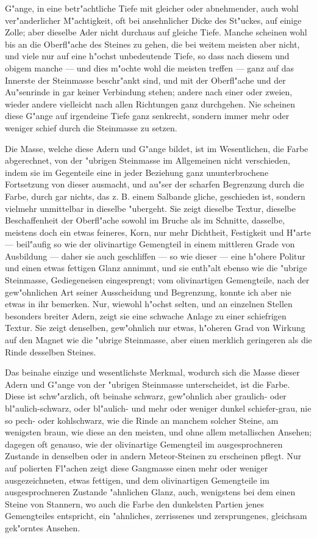 \documentclass[a4paper, 11pt, oneside, german]{article}
\begin{document}
G"ange, in eine betr"achtliche Tiefe mit gleicher oder abnehmender, auch wohl ver"anderlicher M"achtigkeit, oft bei ansehnlicher Dicke des St"uckes, auf einige Zolle; aber dieselbe Ader nicht durchaus auf gleiche Tiefe. Manche scheinen wohl bis an die Oberfl"ache des Steines zu gehen, die bei weitem meisten aber nicht, und viele nur auf eine h"ochst unbedeutende Tiefe, so dass nach diesem und obigem manche --- und dies m"ochte wohl die meisten treffen --- ganz auf das Innerste der Steinmasse beschr"ankt sind, und mit der Oberfl"ache und der Au"senrinde in gar keiner Verbindung stehen; andere nach einer oder zweien, wieder andere vielleicht nach allen Richtungen ganz durchgehen. Nie scheinen diese G"ange auf irgendeine Tiefe ganz senkrecht, sondern immer mehr oder weniger schief durch die Steinmasse zu setzen.

Die Masse, welche diese Adern und G"ange bildet, ist im Wesentlichen, die Farbe abgerechnet, von der "ubrigen Steinmasse im Allgemeinen nicht verschieden, indem sie im Gegenteile eine in jeder Beziehung ganz ununterbrochene Fortsetzung von dieser ausmacht, und au"ser der scharfen Begrenzung durch die Farbe, durch gar nichts, das z. B. einem Salbande gliche, geschieden ist, sondern vielmehr unmittelbar in dieselbe "ubergeht. Sie zeigt dieselbe Textur, dieselbe Beschaffenheit der Oberfl"ache sowohl im Bruche als im Schnitte, dasselbe, meistens doch ein etwas feineres, Korn, nur mehr Dichtheit, Festigkeit und H"arte --- beil"aufig so wie der olivinartige Gemengteil in einem mittleren Grade von Ausbildung --- daher sie auch geschliffen --- so wie dieser --- eine h"ohere Politur und einen etwas fettigen Glanz annimmt, und sie enth"alt ebenso wie die "ubrige Steinmasse, Gediegeneisen eingesprengt; vom olivinartigen Gemengteile, nach der gew"ohnlichen Art seiner Ausscheidung und Begrenzung, konnte ich aber nie etwas in ihr bemerken. Nur, wiewohl h"ochst selten, und an einzelnen Stellen besonders breiter Adern, zeigt sie eine schwache Anlage zu einer schiefrigen Textur. Sie zeigt denselben, gew"ohnlich nur etwas, h"oheren Grad von Wirkung auf den Magnet wie die "ubrige Steinmasse, aber einen merklich geringeren als die Rinde desselben Steines.

Das beinahe einzige und wesentlichste Merkmal, wodurch sich die Masse dieser Adern und G"ange von der "ubrigen Steinmasse unterscheidet, ist die Farbe. Diese ist schw"arzlich, oft beinahe schwarz, gew"ohnlich aber graulich- oder bl"aulich-schwarz, oder bl"aulich- und mehr oder weniger dunkel schiefer-grau, nie so pech- oder kohlschwarz, wie die Rinde an manchem solcher Steine, am wenigsten braun, wie diese an den meisten, und ohne allem metallischen Ansehen; dagegen oft genauso, wie der olivinartige Gemengteil im ausgesprochneren Zustande in denselben oder in andern Meteor-Steinen zu erscheinen pflegt. Nur auf polierten Fl"achen zeigt diese Gangmasse einen mehr oder weniger ausgezeichneten, etwas fettigen, und dem olivinartigen Gemengteile im ausgesprochneren Zustande "ahnlichen Glanz, auch, wenigstens bei dem einen Steine von Stannern, wo auch die Farbe den dunkelsten Partien jenes Gemengteiles entspricht, ein "ahnliches, zerrissenes und zersprungenes, gleichsam gek"orntes Ansehen.
\end{document}
